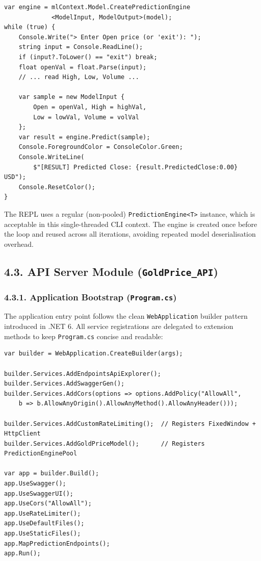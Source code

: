 \begin{lstlisting}
var engine = mlContext.Model.CreatePredictionEngine
             <ModelInput, ModelOutput>(model);
while (true) {
    Console.Write("> Enter Open price (or 'exit'): ");
    string input = Console.ReadLine();
    if (input?.ToLower() == "exit") break;
    float openVal = float.Parse(input);
    // ... read High, Low, Volume ...
    
    var sample = new ModelInput {
        Open = openVal, High = highVal,
        Low = lowVal, Volume = volVal
    };
    var result = engine.Predict(sample);
    Console.ForegroundColor = ConsoleColor.Green;
    Console.WriteLine(
        $"[RESULT] Predicted Close: {result.PredictedClose:0.00} USD");
    Console.ResetColor();
}
\end{lstlisting}

The REPL uses a regular (non-pooled) \texttt{PredictionEngine<T>} instance, which is acceptable in this single-threaded CLI context. The engine is created once before the loop and reused across all iterations, avoiding repeated model deserialisation overhead.

\subsection{4.3. API Server Module (\texttt{GoldPrice\_API})}

\subsubsection{4.3.1. Application Bootstrap (\texttt{Program.cs})}
The application entry point follows the clean \texttt{WebApplication} builder pattern introduced in .NET 6. All service registrations are delegated to extension methods to keep \texttt{Program.cs} concise and readable:

\begin{lstlisting}
var builder = WebApplication.CreateBuilder(args);

builder.Services.AddEndpointsApiExplorer();
builder.Services.AddSwaggerGen();
builder.Services.AddCors(options => options.AddPolicy("AllowAll",
    b => b.AllowAnyOrigin().AllowAnyMethod().AllowAnyHeader()));

builder.Services.AddCustomRateLimiting();  // Registers FixedWindow + HttpClient
builder.Services.AddGoldPriceModel();      // Registers PredictionEnginePool

var app = builder.Build();
app.UseSwagger();
app.UseSwaggerUI();
app.UseCors("AllowAll");
app.UseRateLimiter();
app.UseDefaultFiles();
app.UseStaticFiles();
app.MapPredictionEndpoints();
app.Run();
\end{lstlisting}

